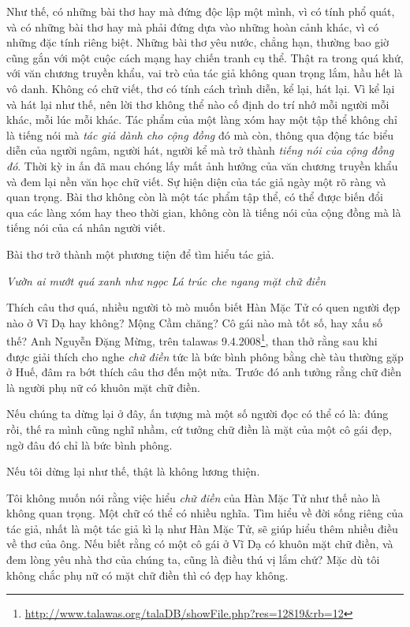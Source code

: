 \documentclass[../main.tex]{subfiles}
\begin{document}
\begin{multicols}{2}
Như thế, có những bài thơ hay mà đứng độc lập một mình, vì có tính phổ quát, và có những bài thơ hay mà phải đứng dựa vào những hoàn cảnh khác, vì có những đặc tính riêng biệt. Những bài thơ yêu nước, chẳng hạn, thường bao giờ cũng gắn với một cuộc cách mạng hay chiến tranh cụ thể. Thật ra trong quá khứ, với văn chương truyền khẩu, vai trò của tác giả không quan trọng lắm, hầu hết là vô danh. Không có chữ viết, thơ có tính cách trình diễn, kể lại, hát lại. Vì kể lại và hát lại như thế, nên lời thơ không thể nào cố định do trí nhớ mỗi người mỗi khác, mỗi lúc mỗi khác. Tác phẩm của một làng xóm hay một tập thể không chỉ là tiếng nói mà \textit{tác giả dành cho cộng đồng }đó mà còn, thông qua động tác biểu diễn của người ngâm, người hát, người kể mà trở thành \textit{tiếng nói của cộng đồng đó}. Thời kỳ in ấn đã mau chóng lấy mất ảnh hưởng của văn chương truyền khẩu và đem lại nền văn học chữ viết. Sự hiện diện của tác giả ngày một rõ ràng và quan trọng. Bài thơ không còn là một tác phẩm tập thể, có thể được biến đổi qua các làng xóm hay theo thời gian, không còn là tiếng nói của cộng đồng mà là tiếng nói của cá nhân người viết. 

Bài thơ trở thành một phương tiện để tìm hiểu tác giả. 
\begin{blockquote}


\textit{Vườn ai mướt quá xanh như ngọc} 
\textit{Lá trúc che ngang mặt chữ điền} 

\end{blockquote}


Thích câu thơ quá, nhiều người tò mò muốn biết Hàn Mặc Tử có quen người đẹp nào ở Vĩ Dạ hay không? Mộng Cầm chăng? Cô gái nào mà tốt số, hay xấu số thế? Anh Nguyễn Đặng Mừng, trên talawas 9.4.2008\footnote{\url{http://www.talawas.org/talaDB/showFile.php?res=12819&rb=12}}, than thở rằng sau khi được giải thích cho nghe \textit{chữ điền} tức là bức bình phông bằng chè tàu thường gặp ở Huế, đâm ra bớt thích câu thơ đến một nửa. Trước đó anh tưởng rằng chữ điền là người phụ nữ có khuôn mặt chữ điền. 

Nếu chúng ta dừng lại ở đây, ấn tượng mà một số người đọc có thể có là: đúng rồi, thế ra mình cũng nghĩ nhầm, cứ tưởng chữ điền là mặt của một cô gái đẹp, ngờ đâu đó chỉ là bức bình phông. 

Nếu tôi dừng lại như thế, thật là không lương thiện. 

Tôi không muốn nói rằng việc hiểu \textit{chữ điền} của Hàn Mặc Tử như thế nào là không quan trọng. Một chữ có thể có nhiều nghĩa. Tìm hiểu về đời sống riêng của tác giả, nhất là một tác giả kì lạ như Hàn Mặc Tử, sẽ giúp hiểu thêm nhiều điều về thơ của ông. Nếu biết rằng có một cô gái ở Vĩ Dạ có khuôn mặt chữ điền, và đem lòng yêu nhà thơ của chúng ta, cũng là điều thú vị lắm chứ? Mặc dù tôi không chắc phụ nữ có mặt chữ điền thì có đẹp hay không. 


\end{multicols}
\end{document}
